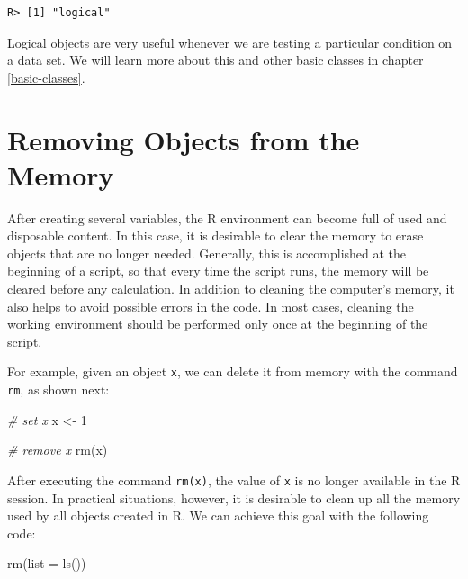 \documentclass[
  12pt,
]{book}
\newenvironment{Shaded}{\begin{snugshade}}{\end{snugshade}}
\newcommand{\AttributeTok}[1]{\textcolor[rgb]{0.61,0.61,0.61}{#1}}
\newcommand{\CommentTok}[1]{\textcolor[rgb]{0.37,0.37,0.37}{\textit{#1}}}
\newcommand{\DecValTok}[1]{\textcolor[rgb]{0.06,0.06,0.06}{#1}}
\newcommand{\FunctionTok}[1]{\textcolor[rgb]{0,0,0}{#1}}
\newcommand{\NormalTok}[1]{#1}
\newcommand{\OtherTok}[1]{\textcolor[rgb]{0.37,0.37,0.37}{#1}}
\newcommand{\StringTok}[1]{\textcolor[rgb]{0.5,0.5,0.5}{#1}}
\begin{document}
\begin{verbatim}
R> [1] "logical"
\end{verbatim}

Logical objects are very useful whenever we are testing a particular condition on a data set. We will learn more about this and other basic classes in chapter \ref{basic-classes}.

\hypertarget{removing-objects-from-the-memory}{%
\section{Removing Objects from the Memory}\label{removing-objects-from-the-memory}}

After creating several variables, the R environment can become full of used and disposable content. In this case, it is desirable to clear the memory to erase objects that are no longer needed. Generally, this is accomplished at the beginning of a script, so that every time the script runs, the memory will be cleared before any calculation. In addition to cleaning the computer's memory, it also helps to avoid possible errors in the code. In most cases, cleaning the working environment should be performed only once at the beginning of the script.

For example, given an object \texttt{x}, we can delete it from memory with the command \texttt{rm}, as shown next: 

\begin{Shaded}
\begin{Highlighting}[]
\CommentTok{\# set x}
\NormalTok{x }\OtherTok{\textless{}{-}} \DecValTok{1}

\CommentTok{\# remove x}
\FunctionTok{rm}\NormalTok{(}\StringTok{\textquotesingle{}x\textquotesingle{}}\NormalTok{)}
\end{Highlighting}
\end{Shaded}

After executing the command \texttt{rm(\textquotesingle{}x\textquotesingle{})}, the value of \texttt{x} is no longer available in the R session. In practical situations, however, it is desirable to clean up all the memory used by all objects created in R. We can achieve this goal with the following code:

\begin{Shaded}
\begin{Highlighting}[]
\FunctionTok{rm}\NormalTok{(}\AttributeTok{list =} \FunctionTok{ls}\NormalTok{())}
\end{Highlighting}
\end{Shaded}
\end{document}

